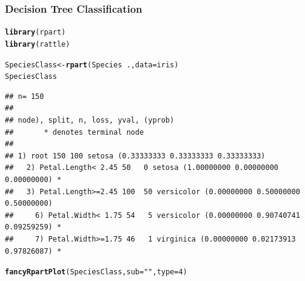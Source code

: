 \documentclass[12pt]{article}\usepackage[]{graphicx}\usepackage[]{xcolor}
\makeatletter
\newcommand{\hlnum}[1]{\textcolor[rgb]{0.686,0.059,0.569}{#1}}%
\newcommand{\hlsng}[1]{\textcolor[rgb]{0.192,0.494,0.8}{#1}}%
\newcommand{\hlopt}[1]{\textcolor[rgb]{0,0,0}{#1}}%
\newcommand{\hldef}[1]{\textcolor[rgb]{0.345,0.345,0.345}{#1}}%
\newcommand{\hlkwb}[1]{\textcolor[rgb]{0.69,0.353,0.396}{#1}}%
\newcommand{\hlkwc}[1]{\textcolor[rgb]{0.333,0.667,0.333}{#1}}%
\newcommand{\hlkwd}[1]{\textcolor[rgb]{0.737,0.353,0.396}{\textbf{#1}}}%
\newenvironment{kframe}{%
 \def\at@end@of@kframe{}%
 \ifinner\ifhmode%
  \def\at@end@of@kframe{\end{minipage}}%
  \begin{minipage}{\columnwidth}%
 \fi\fi%
 \def\FrameCommand##1{\hskip\@totalleftmargin \hskip-\fboxsep
 \colorbox{shadecolor}{##1}\hskip-\fboxsep
     \hskip-\linewidth \hskip-\@totalleftmargin \hskip\columnwidth}%
 \MakeFramed {\advance\hsize-\width
   \@totalleftmargin\z@ \linewidth\hsize
   \@setminipage}}%
 {\par\unskip\endMakeFramed%
 \at@end@of@kframe}
\newenvironment{knitrout}{}{} %
\makeatother
\begin{document}
\newpage
\subsubsection*{Decision Tree Classification}

\begin{knitrout}
\color{fgcolor}\begin{kframe}
\begin{alltt}
\hlkwd{library}\hldef{(rpart)}
\hlkwd{library}\hldef{(rattle)}
\end{alltt}


{\ttfamily\noindent\bfseries\color{errorcolor}{\#\# Error in `library()`:\\\#\# ! there is no package called 'rattle'}}\begin{alltt}
\hldef{SpeciesClass} \hlkwb{<-} \hlkwd{rpart}\hldef{(Species}\hlopt{~}\hldef{.,}\hlkwc{data}\hldef{=iris)}
\hldef{SpeciesClass}
\end{alltt}
\begin{verbatim}
## n= 150 
## 
## node), split, n, loss, yval, (yprob)
##       * denotes terminal node
## 
## 1) root 150 100 setosa (0.33333333 0.33333333 0.33333333)  
##   2) Petal.Length< 2.45 50   0 setosa (1.00000000 0.00000000 0.00000000) *
##   3) Petal.Length>=2.45 100  50 versicolor (0.00000000 0.50000000 0.50000000)  
##     6) Petal.Width< 1.75 54   5 versicolor (0.00000000 0.90740741 0.09259259) *
##     7) Petal.Width>=1.75 46   1 virginica (0.00000000 0.02173913 0.97826087) *
\end{verbatim}
\begin{alltt}
\hlkwd{fancyRpartPlot}\hldef{(SpeciesClass,}\hlkwc{sub}\hldef{=}\hlsng{""}\hldef{,}\hlkwc{type}\hldef{=}\hlnum{4}\hldef{)}
\end{alltt}



\end{kframe}
\end{knitrout}
\end{document}
